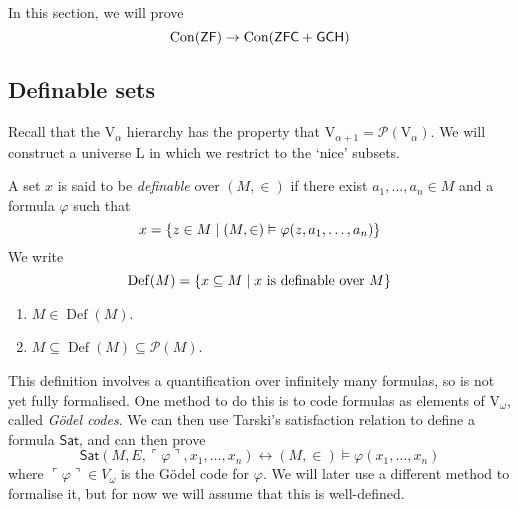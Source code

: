 In this section, we will prove
\[ \operatorname{Con}(\mathsf{ZF}) \to \operatorname{Con}(\mathsf{ZFC} + \mathsf{GCH}) \]

\subsection{Definable sets}
Recall that the \( \mathrm{V}_\alpha \) hierarchy has the property that \( \mathrm{V}_{\alpha + 1} = \mathcal P(\mathrm{V}_\alpha) \).
We will construct a universe \( \mathrm{L} \) in which we restrict to the `nice' subsets.
\begin{definition}
    A set \( x \) is said to be \emph{definable} over \( (M, \in) \) if there exist \( a_1, \dots, a_n \in M \) and a formula \( \varphi \) such that
    \[ x = \qty{z \in M \mid (M, \in) \vDash \varphi(z, a_1, \dots, a_n)} \]
    We write
    \[ \operatorname{Def}(M) = \qty{x \subseteq M \mid x \text{ is definable over } M} \]
\end{definition}
\begin{remark}
    \begin{enumerate}
        \item \( M \in \operatorname{Def}(M) \).
        \item \( M \subseteq \operatorname{Def}(M) \subseteq \mathcal P(M) \).
    \end{enumerate}
\end{remark}
This definition involves a quantification over infinitely many formulas, so is not yet fully formalised.
One method to do this is to code formulas as elements of \( \mathrm{V}_\omega \), called \emph{G\"odel codes}.
We can then use Tarski's satisfaction relation to define a formula \( \mathsf{Sat} \), and can then prove
\[ \mathsf{Sat}(M, E, \ulcorner \varphi \urcorner, x_1, \dots, x_n) \leftrightarrow (M, \in) \vDash \varphi(x_1, \dots, x_n) \]
where \( \ulcorner \varphi \urcorner \in V_\omega \) is the G\"odel code for \( \varphi \).
We will later use a different method to formalise it, but for now we will assume that this is well-defined.

